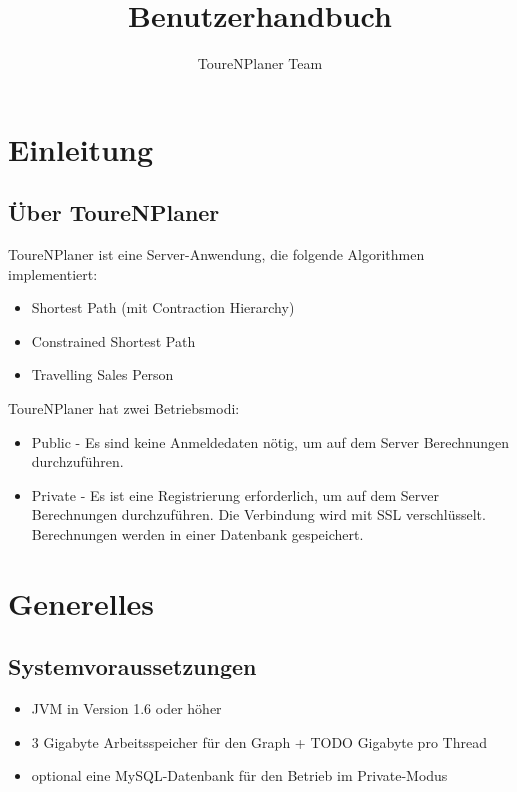 \documentclass[ngerman,titlepage,parskip=true]{scrartcl}
\title{Benutzerhandbuch}
\author{ToureNPlaner Team}
\begin{document}
\maketitle

\tableofcontents

\pagebreak

\section{Einleitung}

	\subsection{\"Uber ToureNPlaner}
   ToureNPlaner ist eine Server-Anwendung, die folgende Algorithmen implementiert:
   \begin{itemize}
     \item Shortest Path (mit Contraction Hierarchy)
     \item Constrained Shortest Path
     \item Travelling Sales Person
   \end{itemize}
   ToureNPlaner hat zwei Betriebsmodi:
   \begin{itemize}
     \item Public - Es sind keine Anmeldedaten n\"otig, um auf dem Server Berechnungen durchzuf\"uhren.
     \item Private - Es ist eine Registrierung erforderlich, um auf dem Server Berechnungen durchzuf\"uhren. Die Verbindung wird mit SSL verschl\"usselt. Berechnungen werden in einer Datenbank gespeichert.
   \end{itemize}


\section{Generelles}
	\subsection{Systemvoraussetzungen}
	
	\begin{itemize}
		\item JVM in Version 1.6 oder h\"oher
		\item 3 Gigabyte Arbeitsspeicher f\"ur den Graph + TODO Gigabyte pro Thread
		\item optional eine MySQL-Datenbank f\"ur den Betrieb im Private-Modus
	\end{itemize}
\end{document}
